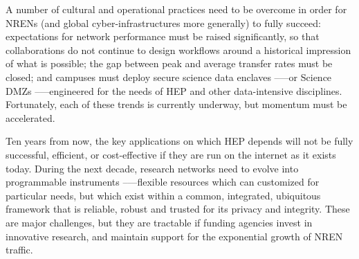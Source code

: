 A number of cultural and operational practices need to be overcome in order for NRENs (and global cyber-infrastructures more generally) to fully succeed: expectations for network performance must be raised significantly, so that collaborations do not continue to design workflows around a historical impression of what is possible; the gap between peak and average transfer rates must be closed; and campuses must deploy secure science data enclaves –---or  Science DMZs\cite{DMZ} –---engineered for the needs of HEP and other data-intensive disciplines.  Fortunately, each of these trends is currently underway, but momentum must be accelerated.   

Ten years from now, the key applications on which HEP depends will not be fully successful, efficient, or cost-effective if they are run on the internet as it exists today. During the next decade, research networks need to evolve into programmable instruments –---flexible resources which can customized for particular needs, but which exist within a common, integrated, ubiquitous framework that is reliable, robust and trusted for its privacy and integrity. These are major challenges, but they are tractable if funding agencies invest in innovative research, and maintain support for the exponential growth of NREN traffic. 

